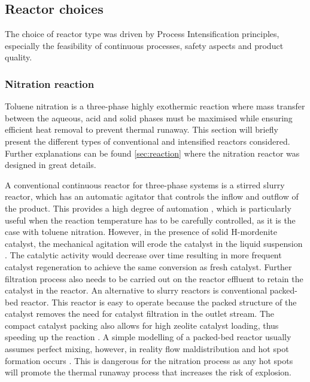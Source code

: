 
\subsection{Reactor choices}
\label{sec:reactorchoices}

The choice of reactor type was driven by Process Intensification principles, especially the feasibility of continuous processes, safety aspects and product quality. 

\subsubsection{Nitration reaction} \label{sec:synthesis-R1}

Toluene nitration is a three-phase highly exothermic reaction where mass transfer between the aqueous, acid and solid phases must be maximised while ensuring efficient heat removal to prevent thermal runaway. This section will briefly present the different types of conventional and intensified reactors considered. Further explanations can be found \cref{sec:reaction} where the nitration reactor was designed in great details.

A conventional continuous reactor for three-phase systems is a stirred slurry reactor, which has an automatic agitator that controls the inflow and outflow of the product. This provides a high degree of automation \cite{liu_nitration_2019}, which is particularly useful when the reaction temperature has to be carefully controlled, as it is the case with toluene nitration. However, in the presence of solid H-mordenite catalyst, the mechanical agitation will erode the catalyst in the liquid suspension \cite{argyle_heterogeneous_2015}. The catalytic activity would decrease over time resulting in more frequent catalyst regeneration to achieve the same conversion as fresh catalyst. Further filtration process also needs to be carried out on the reactor effluent to retain the catalyst in the reactor. 
An alternative to slurry reactors is conventional packed-bed reactor. This reactor is easy to operate because the packed structure of the catalyst removes the need for catalyst filtration in the outlet stream. The compact catalyst packing also allows for high zeolite catalyst loading, thus speeding up the reaction \cite{kashid_microstructured_2009}. A simple modelling of a packed-bed reactor usually assumes perfect mixing, however, in reality flow maldistribution and hot spot formation occurs \cite{nguyen_flow_1994}. This is dangerous for the nitration process as any hot spots will promote the thermal runaway process that increases the risk of explosion. 

